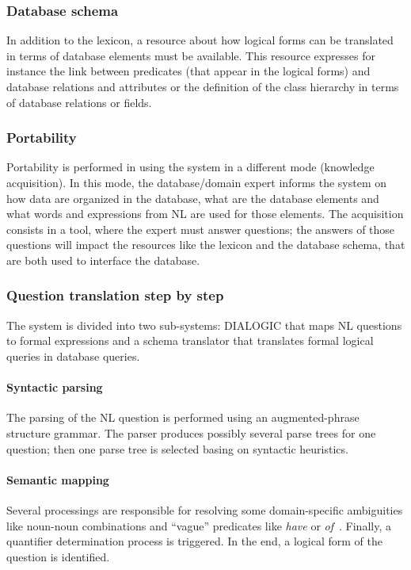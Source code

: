 \documentclass[10pt,journal,letterpaper,compsoc]{IEEEtran}
\begin{document}
\subsubsection{Database schema}
In addition to the lexicon, a resource about how logical forms can be translated
in terms of database elements must be available. 
This resource expresses for instance the link between predicates (that appear in the
logical forms) and database relations and attributes or the definition of the
class hierarchy in terms of database relations or fields.




\subsubsection{Portability}
Portability is performed in using the system in a different mode (knowledge
acquisition). In this mode, the database/domain expert informs the system on how
data are organized in the database, what are the database elements and what
words and expressions from NL are used for those elements.
The acquisition consists in a tool, where the expert must answer questions; the
answers of those questions will impact the resources like the lexicon and the
database schema, that are both used to interface the database. 




\subsubsection{Question translation step by step}
The system is divided into two sub-systems: DIALOGIC that maps NL questions to
formal expressions and a schema translator that translates formal logical
queries in database queries. 
\paragraph{Syntactic parsing}
The parsing of the NL question is performed using an augmented-phrase structure
grammar. The parser produces possibly several parse trees for one question; then
one parse tree is selected basing on syntactic heuristics. 


\paragraph{Semantic mapping}
Several processings are responsible for resolving some domain-specific
ambiguities like noun-noun combinations and ``vague'' predicates like {\it
have} or {\it of}~\cite{Grosz:1987:TED:25672.25674}. Finally, a quantifier
determination process is triggered. 
In the end, a logical form of the question is identified. 
\end{document}
